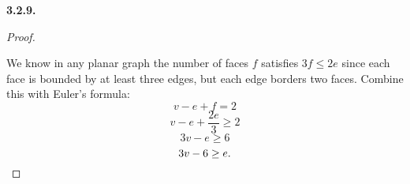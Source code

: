 \documentclass[12pt,]{book}
\theoremstyle{plain}
\theoremstyle{definition}
\theoremstyle{definition}
\theoremstyle{definition}
\numberwithin{equation}{chapter}
\begin{document}
\par\smallskip
\noindent\textbf{3.2.9.} \begin{proof}\hypertarget{proof-42}{}
\hypertarget{p-1672}{}%
We know in any planar graph the number of faces \(f\) satisfies \(3f \le 2e\) since each face is bounded by at least three edges, but each edge borders two faces. Combine this with Euler's formula:%
\begin{equation*}
v - e + f = 2
\end{equation*}
%
\begin{equation*}
v - e + \frac{2e}{3} \ge 2
\end{equation*}
%
\begin{equation*}
3v - e \ge 6
\end{equation*}
%
\begin{equation*}
3v - 6 \ge e.\qedhere
\end{equation*}
%
\end{proof}
\par\smallskip
\end{document}

